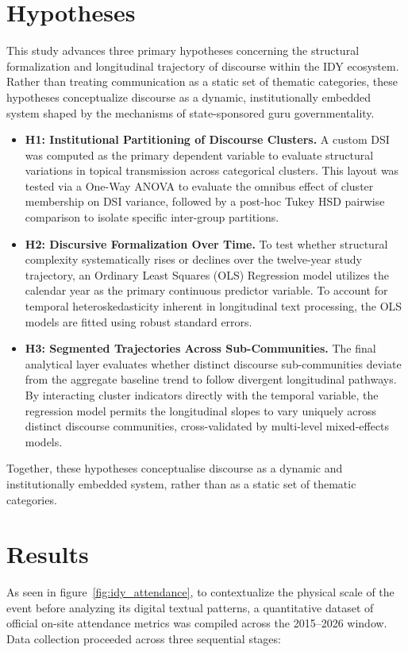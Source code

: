 \documentclass[11pt]{article}
\begin{document}
\section{Hypotheses}
This study advances three primary hypotheses concerning the structural formalization and longitudinal trajectory of discourse within the IDY ecosystem. Rather than treating communication as a static set of thematic categories, these hypotheses conceptualize discourse as a dynamic, institutionally embedded system shaped by the mechanisms of state-sponsored guru governmentality.

\begin{itemize}
    \item \textbf{H1: Institutional Partitioning of Discourse Clusters.} A custom DSI was computed as the primary dependent variable to evaluate structural variations in topical transmission across categorical clusters. This layout was tested via a One-Way ANOVA to evaluate the omnibus effect of cluster membership on DSI variance, followed by a post-hoc Tukey HSD pairwise comparison to isolate specific inter-group partitions.
    
    \item \textbf{H2: Discursive Formalization Over Time.} To test whether structural complexity systematically rises or declines over the twelve-year study trajectory, an Ordinary Least Squares (OLS) Regression model utilizes the calendar year as the primary continuous predictor variable. To account for temporal heteroskedasticity inherent in longitudinal text processing, the OLS models are fitted using robust standard errors.
    
    \item \textbf{H3: Segmented Trajectories Across Sub-Communities.} The final analytical layer evaluates whether distinct discourse sub-communities deviate from the aggregate baseline trend to follow divergent longitudinal pathways. By interacting cluster indicators directly with the temporal variable, the regression model permits the longitudinal slopes to vary uniquely across distinct discourse communities, cross-validated by multi-level mixed-effects models.
\end{itemize}

Together, these hypotheses conceptualise discourse as a dynamic and institutionally embedded system, rather than as a static set of thematic categories.

\section{Results}
As seen in figure~\ref{fig:idy_attendance}, to contextualize the physical scale of the event before analyzing its digital textual patterns, a quantitative dataset of official on-site attendance metrics was compiled across the 2015--2026 window. Data collection proceeded across three sequential stages:
\end{document}
